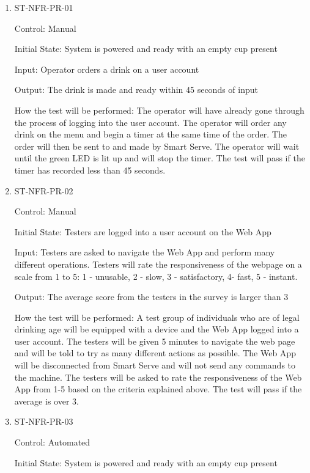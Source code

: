 \documentclass[12pt, titlepage]{article}
\begin{document}
\begin{enumerate}

\item{ST-NFR-PR-01\\}

Control: Manual

Initial State: System is powered and ready with an empty cup present

Input: Operator orders a drink on a user account

Output: The drink is made and ready within 45 seconds of input

How the test will be performed: The operator will have already gone through the process of logging into the user account. The operator will order any drink on the menu and begin a timer at the same time of the order. The order will then be sent to and made by Smart Serve. The operator will wait until the green LED is lit up and will stop the timer. The test will pass if the timer has recorded less than 45 seconds.
					
\item{ST-NFR-PR-02\\}

Control: Manual

Initial State: Testers are logged into a user account on the Web App

Input: Testers are asked to navigate the Web App and perform many different operations. Testers will rate the responsiveness of the webpage on a scale from 1 to 5: 1 - unusable, 2 - slow, 3 - satisfactory, 4- fast, 5 - instant.

Output: The average score from the testers in the survey is larger than 3

How the test will be performed: A test group of individuals who are of legal drinking age will be equipped with a device and the Web App logged into a user account. The testers will be given 5 minutes to navigate the web page and will be told to try as many different actions as possible. The Web App will be disconnected from Smart Serve and will not send any commands to the machine. The testers will be asked to rate the responsiveness of the Web App from 1-5 based on the criteria explained above. The test will pass if the average is over 3.

\item{ST-NFR-PR-03\\}

Control: Automated

Initial State: System is powered and ready with an empty cup present


\end{enumerate}
\end{document}
